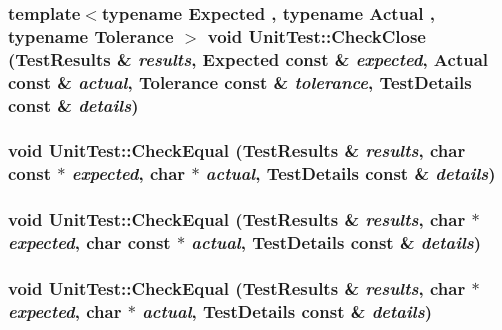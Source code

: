 \hypertarget{namespace_unit_test_4086d446da4d2df0cb8fd6f121f74b8b}{
\subsubsection[{CheckClose}]{\setlength{\rightskip}{0pt plus 5cm}template$<$typename Expected , typename Actual , typename Tolerance $>$ void UnitTest::CheckClose (TestResults \& {\em results}, \/  Expected const \& {\em expected}, \/  Actual const \& {\em actual}, \/  Tolerance const \& {\em tolerance}, \/  TestDetails const \& {\em details})}}
\label{namespace_unit_test_4086d446da4d2df0cb8fd6f121f74b8b}


\hypertarget{namespace_unit_test_229093d68e4f13b6afd140dc17573446}{
\subsubsection[{CheckEqual}]{\setlength{\rightskip}{0pt plus 5cm}void UnitTest::CheckEqual (TestResults \& {\em results}, \/  char const $\ast$ {\em expected}, \/  char $\ast$ {\em actual}, \/  TestDetails const \& {\em details})}}
\label{namespace_unit_test_229093d68e4f13b6afd140dc17573446}


\hypertarget{namespace_unit_test_bfd1f36d8211da65b2fbd37fdc2b2329}{
\subsubsection[{CheckEqual}]{\setlength{\rightskip}{0pt plus 5cm}void UnitTest::CheckEqual (TestResults \& {\em results}, \/  char $\ast$ {\em expected}, \/  char const $\ast$ {\em actual}, \/  TestDetails const \& {\em details})}}
\label{namespace_unit_test_bfd1f36d8211da65b2fbd37fdc2b2329}


\hypertarget{namespace_unit_test_6220237fc4a12beb675d834cc0062aa8}{
\subsubsection[{CheckEqual}]{\setlength{\rightskip}{0pt plus 5cm}void UnitTest::CheckEqual (TestResults \& {\em results}, \/  char $\ast$ {\em expected}, \/  char $\ast$ {\em actual}, \/  TestDetails const \& {\em details})}}
\label{namespace_unit_test_6220237fc4a12beb675d834cc0062aa8}


